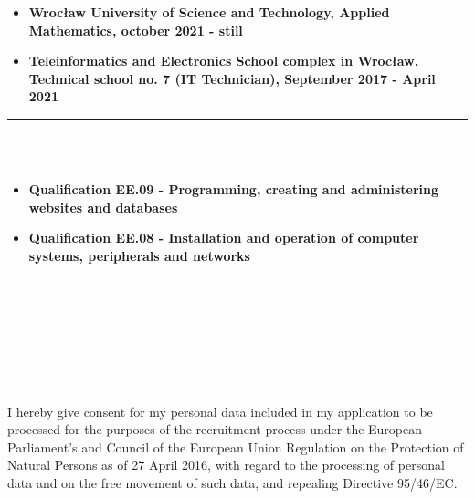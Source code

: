 \documentclass[10pt]{article}
\begin{document}
\begin{minipage}[t]{0.60\textwidth}
        \fontsize{10pt}{10pt}
        \begin{itemize}[leftmargin=*]
            \setlength{\parskip}{0pt}
            \item \textbf{Wrocław University of Science and Technology, Applied Mathematics, october 2021 - still}
            \item \textbf{Teleinformatics and Electronics School complex in Wrocław, \\ Technical school no. 7 (IT Technician), September 2017 - April 2021} 
        \end{itemize}
        \rule{11cm}{1pt} \\ \\
        \fontsize{10pt}{10pt}
        \begin{itemize}[leftmargin=*]
            \setlength{\parskip}{0pt}
            \item \textbf{Qualification EE.09 - Programming, creating and administering \\ websites and databases}
            \item \textbf{Qualification EE.08 - Installation and operation of computer systems, peripherals and networks}
        \end{itemize}
        \rule{0pt}{0pt} \\ \\ \\ \\ \\ \\ \\ 
        \fontsize{7pt}{5pt}\selectfont  
        I hereby give consent for my personal data included in my application to be processed for 
        the purposes of the recruitment process under the European Parliament's and Council of the 
        European Union Regulation on the Protection of Natural Persons as of 27 April 2016, with 
        regard to the processing of personal data and on the free movement of such data, and repealing 
        Directive 95/46/EC.
    \end{minipage}
\end{document}
